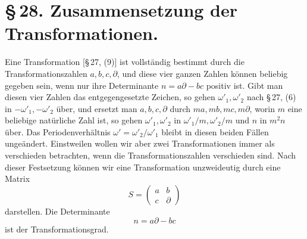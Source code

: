 \documentclass[11pt]{article}
\begin{document}
\section*{\S\,28. Zusammensetzung der Transformationen.}

Eine Transformation [\S\,27, (9)] ist vollständig bestimmt durch die Transformationszahlen $a,b,c,\partial$, und diese vier ganzen Zahlen können beliebig gegeben sein, wenn nur ihre Determinante $n=a\partial-bc$ positiv ist. Gibt man diesen vier Zahlen das entgegengesetzte Zeichen, so gehen $\omega'_1,\omega'_2$ nach \S\,27, (6) in $-\omega'_1,-\omega'_2$ über, und ersetzt man $a,b,c,\partial$ durch $ma,mb,mc,m\partial$, worin $m$ eine beliebige natürliche Zahl ist, so gehen $\omega'_1,\omega'_2$ in $\omega'_1/m,\omega'_2/m$ und $n$ in $m^2n$ über. Das Periodenverhältnis $\omega'=\omega'_2/\omega'_1$ bleibt in diesen beiden Fällen ungeändert. Einstweilen wollen wir aber zwei Transformationen immer als verschieden betrachten, wenn die Transformationszahlen verschieden sind. Nach dieser Festsetzung können wir eine Transformation unzweideutig durch eine Matrix
\begin{equation}
S=\begin{pmatrix}a&b\\ c&\partial\end{pmatrix} \tag{1}
\end{equation}
darstellen. Die Determinante
\begin{equation}
n=a\partial-bc \tag{2}
\end{equation}
ist der Transformationsgrad.
\end{document}
